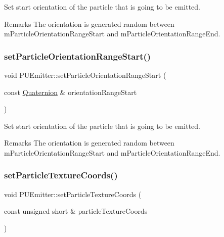 Set start orientation of the particle that is going to be emitted. \begin{DoxyRemark}{Remarks}
The orientation is generated random between m\+Particle\+Orientation\+Range\+Start and m\+Particle\+Orientation\+Range\+End. 
\end{DoxyRemark}
\mbox{\label{classPUEmitter_a1832a77324bd2c4097d29d8789b27e33}} 
\subsubsection{\texorpdfstring{set\+Particle\+Orientation\+Range\+Start()}{setParticleOrientationRangeStart()}\hspace{0.1cm}{\footnotesize\ttfamily [2/2]}}
{\footnotesize\ttfamily void P\+U\+Emitter\+::set\+Particle\+Orientation\+Range\+Start (\begin{DoxyParamCaption}\item[{const \hyperlink{classQuaternion}{Quaternion} \&}]{orientation\+Range\+Start }\end{DoxyParamCaption})}

Set start orientation of the particle that is going to be emitted. \begin{DoxyRemark}{Remarks}
The orientation is generated random between m\+Particle\+Orientation\+Range\+Start and m\+Particle\+Orientation\+Range\+End. 
\end{DoxyRemark}
\mbox{\label{classPUEmitter_a400b39eba5fa388728c51eda60b11163}} 
\subsubsection{\texorpdfstring{set\+Particle\+Texture\+Coords()}{setParticleTextureCoords()}\hspace{0.1cm}{\footnotesize\ttfamily [1/2]}}
{\footnotesize\ttfamily void P\+U\+Emitter\+::set\+Particle\+Texture\+Coords (\begin{DoxyParamCaption}\item[{const unsigned short \&}]{particle\+Texture\+Coords }\end{DoxyParamCaption})}

